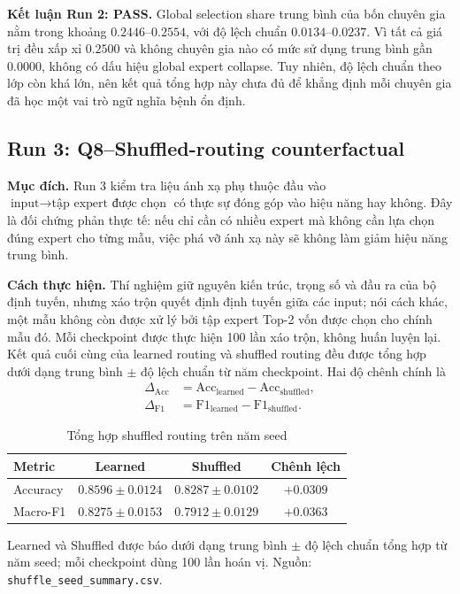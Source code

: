 \documentclass[conference]{IEEEtran}
\newcommand{\meanstd}{trung bình $\pm$ độ lệch chuẩn}
\begin{document}
\textbf{Kết luận Run 2: PASS.} Global selection share trung bình của bốn
chuyên gia nằm trong khoảng $0.2446$--$0.2554$, với độ lệch chuẩn
$0.0134$--$0.0237$. Vì tất cả giá trị đều xấp xỉ $0.2500$ và không chuyên gia
nào có mức sử dụng trung bình gần $0.0000$, không có dấu hiệu global expert collapse.
Tuy nhiên, độ lệch chuẩn theo lớp còn khá lớn, nên kết quả tổng hợp này chưa
đủ để khẳng định mỗi chuyên gia đã học một vai trò ngữ nghĩa bệnh ổn định.

\subsection{Run 3: Q8--Shuffled-routing counterfactual}

\textbf{Mục đích.} Run 3 kiểm tra liệu ánh xạ phụ thuộc đầu vào
$\text{input}\rightarrow\text{tập expert được chọn}$ có thực sự đóng góp vào
hiệu năng hay không. Đây là đối chứng phản thực tế: nếu chỉ cần có nhiều
expert mà không cần lựa chọn đúng expert cho từng mẫu, việc phá vỡ ánh xạ này
sẽ không làm giảm hiệu năng trung bình.

\textbf{Cách thực hiện.} Thí nghiệm giữ nguyên kiến trúc, trọng số và đầu ra
của bộ định tuyến, nhưng xáo trộn quyết định định tuyến giữa các input; nói
cách khác, một mẫu không còn được xử lý bởi tập expert Top-2 vốn được chọn cho
chính mẫu đó. Mỗi checkpoint được thực hiện 100 lần xáo trộn, không huấn
luyện lại. Kết quả cuối cùng của learned routing và shuffled routing đều được
tổng hợp dưới dạng trung bình $\pm$ độ lệch chuẩn từ năm checkpoint. Hai độ
chênh chính là
\begin{align}
\Delta_{\mathrm{Acc}} &= \mathrm{Acc}_{\mathrm{learned}}
- \mathrm{Acc}_{\mathrm{shuffled}},\\
\Delta_{\mathrm{F1}} &= \mathrm{F1}_{\mathrm{learned}}
- \mathrm{F1}_{\mathrm{shuffled}}.
\end{align}

\begin{table}[H]
\caption{Tổng hợp shuffled routing trên năm seed}
\label{tab:shuffle-summary}
\centering
\scriptsize
\begin{tabular}{@{}lccc@{}}
\toprule
Metric & Learned & Shuffled & Chênh lệch \\
\midrule
Accuracy & $0.8596\pm0.0124$ & $0.8287\pm0.0102$ & $+0.0309$ \\
Macro-F1 & $0.8275\pm0.0153$ & $0.7912\pm0.0129$ & $+0.0363$ \\
\bottomrule
\end{tabular}
\vspace{2pt}

\raggedright\scriptsize Learned và Shuffled được báo dưới dạng \meanstd{}
tổng hợp từ năm seed; mỗi checkpoint dùng 100 lần hoán vị. Nguồn:
\texttt{shuffle\_seed\_summary.csv}.
\end{table}
\end{document}
